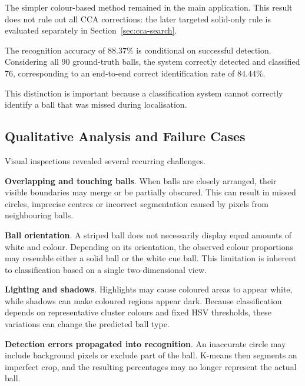 \documentclass[10pt,a4paper]{article}
\begin{document}
The simpler colour-based method remained in the main application. This result
does not rule out all CCA corrections: the later targeted solid-only rule is
evaluated separately in Section~\ref{sec:cca-search}.

The recognition accuracy of $88.37\%$ is conditional on successful detection. 
Considering all 90 ground-truth balls, the system correctly detected and 
classified 76, corresponding to an end-to-end correct identification rate of $84.44\%$.

This distinction is important because a classification system cannot correctly 
identify a ball that was missed during localisation.








\subsection{Qualitative Analysis and Failure Cases}

Visual inspections revealed several recurring challenges.

\textbf{Overlapping and touching balls}. When balls are closely arranged, their 
visible boundaries may merge or be partially obscured. This can result in 
missed circles, imprecise centres or incorrect segmentation caused by pixels 
from neighbouring balls.

\textbf{Ball orientation}. A striped ball does not necessarily display equal amounts 
of white and colour. Depending on its orientation, the observed colour 
proportions may resemble either a solid ball or the white cue ball. This 
limitation is inherent to classification based on a single two-dimensional view.

\textbf{Lighting and shadows}. Highlights may cause coloured areas to appear white, 
while shadows can make coloured regions appear dark. Because classification 
depends on representative cluster colours and fixed HSV thresholds, these 
variations can change the predicted ball type.

\textbf{Detection errors propagated into recognition}. An inaccurate circle may 
include background pixels or exclude part of the ball. K-means then segments 
an imperfect crop, and the resulting percentages may no longer represent the 
actual ball.
\end{document}
